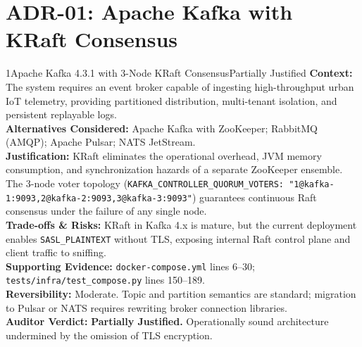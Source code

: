 \documentclass[10pt,a4paper]{report}
\begin{document}
\section{ADR-01: Apache Kafka with KRaft Consensus}
\begin{adrbox}{1}{Apache Kafka 4.3.1 with 3-Node KRaft Consensus}{Partially Justified}
\textbf{Context:} The system requires an event broker capable of ingesting high-throughput urban IoT telemetry, providing partitioned distribution, multi-tenant isolation, and persistent replayable logs.\\
\textbf{Alternatives Considered:} Apache Kafka with ZooKeeper; RabbitMQ (AMQP); Apache Pulsar; NATS JetStream.\\
\textbf{Justification:} KRaft eliminates the operational overhead, JVM memory consumption, and synchronization hazards of a separate ZooKeeper ensemble. The 3-node voter topology (\texttt{KAFKA\_CONTROLLER\_QUORUM\_VOTERS: "1@kafka-1:9093,2@kafka-2:9093,3@kafka-3:9093"}) guarantees continuous Raft consensus under the failure of any single node.\\
\textbf{Trade-offs \& Risks:} KRaft in Kafka 4.x is mature, but the current deployment enables \texttt{SASL\_PLAINTEXT} without TLS, exposing internal Raft control plane and client traffic to sniffing.\\
\textbf{Supporting Evidence:} \texttt{docker-compose.yml} lines 6--30; \texttt{tests/infra/test\_compose.py} lines 150--189.\\
\textbf{Reversibility:} Moderate. Topic and partition semantics are standard; migration to Pulsar or NATS requires rewriting broker connection libraries.\\
\textbf{Auditor Verdict:} \textbf{Partially Justified.} Operationally sound architecture undermined by the omission of TLS encryption.
\end{adrbox}
\end{document}
